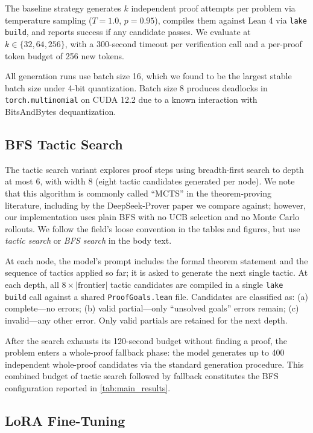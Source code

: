 \documentclass[openany, amssymb, psamsfonts]{amsart}
\theoremstyle{definition}
\numberwithin{equation}{section}
\begin{document}
The baseline strategy generates $k$ independent proof attempts per problem via
temperature sampling ($T = 1.0$, $p = 0.95$), compiles them against Lean 4 via
\texttt{lake build}, and reports success if any candidate passes.
We evaluate at $k \in \{32, 64, 256\}$, with a 300-second timeout per
verification call and a per-proof token budget of 256 new tokens.

All generation runs use batch size 16, which we found to be the largest
stable batch size under 4-bit quantization.
Batch size 8 produces deadlocks in \texttt{torch.multinomial} on CUDA 12.2 due
to a known interaction with BitsAndBytes dequantization.

\subsection{BFS Tactic Search}
\label{sec:method_mcts}

The tactic search variant explores proof steps using breadth-first search
to depth at most 6, with width 8 (eight tactic candidates generated per node).
We note that this algorithm is commonly called ``MCTS'' in the theorem-proving
literature, including by the DeepSeek-Prover paper we compare against; however,
our implementation uses plain BFS with no UCB selection and no Monte Carlo rollouts.
We follow the field's loose convention in the tables and figures, but use
\emph{tactic search} or \emph{BFS search} in the body text.

At each node, the model's prompt includes the formal theorem statement and
the sequence of tactics applied so far; it is asked to generate the next
single tactic.
At each depth, all $8 \times |\text{frontier}|$ tactic candidates are compiled
in a single \texttt{lake build} call against a shared \texttt{ProofGoals.lean}
file.
Candidates are classified as: (a) complete---no errors; (b) valid partial---only
``unsolved goals'' errors remain; (c) invalid---any other error.
Only valid partials are retained for the next depth.

After the search exhausts its 120-second budget without finding a proof,
the problem enters a whole-proof fallback phase: the model generates up to 400
independent whole-proof candidates via the standard generation procedure.
This combined budget of tactic search followed by fallback constitutes the
BFS configuration reported in \autoref{tab:main_results}.

\subsection{LoRA Fine-Tuning}
\end{document}
